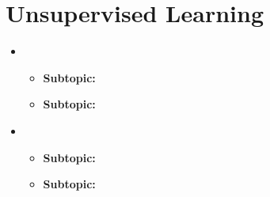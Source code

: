 
\section{Unsupervised Learning}
\medskip
\begin{itemize}

    \item {}

    \begin{itemize}
    \item \textbf{Subtopic:}
    \item \textbf{Subtopic:}
    \end{itemize}

    \item {}

    \begin{itemize}
    \item \textbf{Subtopic:}
    \item \textbf{Subtopic:}
    \end{itemize}



\end{itemize}


